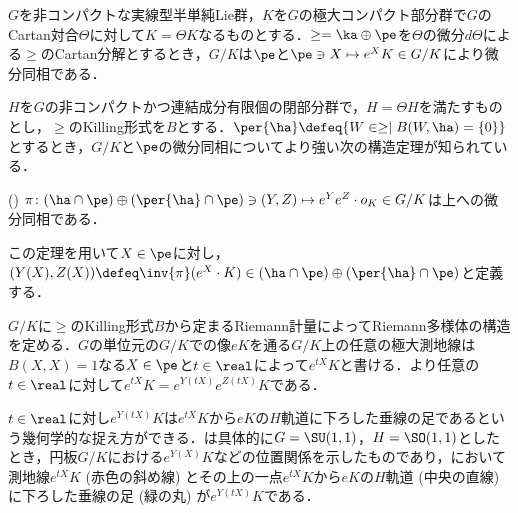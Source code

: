 $G$を非コンパクトな実線型半単純Lie群，$K$を$G$の極大コンパクト部分群で$G$のCartan対合$\Theta$に対して$K = \Theta K $なるものとする．$\ge = \ka \oplus \pe $を$\Theta$の微分$d\Theta$による$\ge$のCartan分解とするとき，$G/K$は$\pe$と$\pe \ni X\mapsto e^{X}K\in G/K $により微分同相である．

$H$を$G$の非コンパクトかつ連結成分有限個の閉部分群で，$H = \Theta H$を満たすものとし，$\ge$のKilling形式を$B$とする．$\per{\ha}\defeq \{W\in \ge\mid B(W, \ha) = \{0\} \} $とするとき，$G/K$と$\pe$の微分同相についてより強い次の構造定理が知られている．

\begin{thm*}(\cite[Lemma~6.1]{kob89})\label{thm:kob89-lem6.1}  
  $\pi\colon  (\ha\cap\pe)\oplus (\per{\ha}\cap \pe) \ni (Y, Z)\mapsto e^{Y}e^{Z}\cdot o_K \in G/K $は上への微分同相である．
\end{thm*}
この定理を用いて$X\in \pe$に対し，${(Y(X), Z(X))\defeq \inv{\pi}(e^X\cdot K)\in (\ha\cap\pe)\oplus (\per{\ha}\cap \pe)}$と定義する．

$G/K$に$\ge$のKilling形式$B$から定まるRiemann計量によってRiemann多様体の構造を定める．$G$の単位元の$G/K$での像$eK$を通る$G/K$上の任意の極大測地線は$B(X, X) = 1 $なる$X\in \pe$と$t\in \real$によって$e^{tX}K $と書ける．より任意の$t\in \real$に対して$e^{tX}K = e^{Y(tX)}e^{Z(tX)}K $である．

$t\in \real$に対し$e^{Y(tX)}K $は$e^{tX}K $から$eK$の$H$軌道に下ろした垂線の足であるという幾何学的な捉え方ができる．は具体的に$G = \SU(1,1) $，$H = \SO(1,1) $としたとき，{\Poincare}円板$G/K$における$e^{Y(X)}K $などの位置関係を示したものであり，において測地線$e^{tX}K$ (赤色の斜め線) とその上の一点$e^{tX}K$から$eK$の$H$軌道 (中央の直線) に下ろした垂線の足 (緑の丸) が$e^{Y(tX)}K $である．



